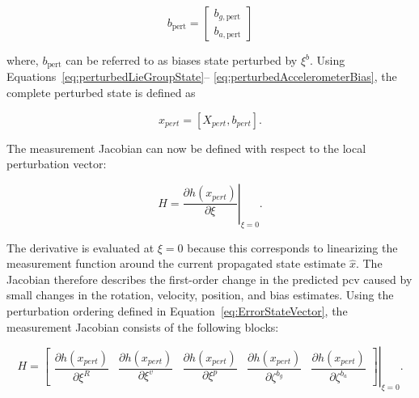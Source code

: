 \documentclass[report.tex]{subfiles}
\begin{document}
    \begin{equation}
        b_{\mathrm{pert}}
        =
        \begin{bmatrix}
            b_{g,\mathrm{pert}} \\
            b_{a,\mathrm{pert}}
        \end{bmatrix}
        \label{eq:perturbedBiases}
    \end{equation}

    where, $b_{\mathrm{pert}}$ can be referred to as biases state perturbed by $\xi^{b}$. 
    Using Equations~\ref{eq:perturbedLieGroupState}-- \ref{eq:perturbedAccelerometerBias}, the complete perturbed state is defined as

    \begin{equation}
        x_{pert}
        =
        [
            X_{pert},
            b_{pert}
        ].
        \label{eq:perturbedState}
    \end{equation}

    The measurement Jacobian can now be defined with respect to the local perturbation vector:

    \begin{equation}
        H
        =
        \left.
        \frac{\partial h(
        x_{pert})}
            {\partial \xi}
        \right|_{\xi=0}.
        \label{eq:MeasurementJacobian-1}
    \end{equation}
    
    The derivative is evaluated at $\xi=0$ because this corresponds to linearizing the measurement function around the current propagated state estimate $\hat{x}$. The Jacobian therefore describes the first-order change in the predicted \gls{pcv} caused by small changes in the rotation, velocity, position, and bias estimates. Using the perturbation ordering defined in Equation~\ref{eq:ErrorStateVector}, the measurement Jacobian consists of the following blocks:

    \begin{equation}
        H
        =
        \left.
        \begin{bmatrix}
            \dfrac{\partial h(x_{pert})}
                {\partial\xi^{R}}
            &
            \dfrac{\partial h(x_{pert})}
                {\partial\xi^{v}}
            &
            \dfrac{\partial h(x_{pert})}
                {\partial\xi^p}
            &
            \dfrac{\partial h(x_{pert})}
                {\partial\zeta^{b_g}}
            &
            \dfrac{\partial h(x_{pert})}
                {\partial\zeta^{b_a}}
        \end{bmatrix}
        \right|_{\xi=0}.
        \label{eq:MeasurementJacobian-2}
    \end{equation}
\end{document}
